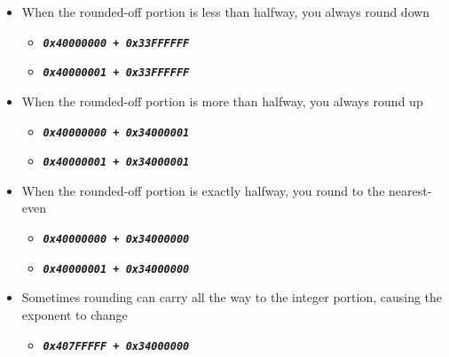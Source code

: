 \begin{itemize}
    \item When the rounded-off portion is less than halfway, you always round down
    \begin{itemize}
        \item[] \texttt{\textbf{\textit{0x40000000 + 0x33FFFFFF}}}
        \item[] \texttt{\textbf{\textit{0x40000001 + 0x33FFFFFF}}}
    \end{itemize}
    \item When the rounded-off portion is more than halfway, you always round up
    \begin{itemize}
        \item[] \texttt{\textbf{\textit{0x40000000 + 0x34000001}}}
        \item[] \texttt{\textbf{\textit{0x40000001 + 0x34000001}}}
    \end{itemize}
    \item When the rounded-off portion is exactly halfway, you round to the nearest-even
    \begin{itemize}
        \item[] \texttt{\textbf{\textit{0x40000000 + 0x34000000}}}
        \item[] \texttt{\textbf{\textit{0x40000001 + 0x34000000}}}
    \end{itemize}
    \item Sometimes rounding can carry all the way to the integer portion, causing the exponent to change
    \begin{itemize}
        \item[] \texttt{\textbf{\textit{0x407FFFFF + 0x34000000}}}
    \end{itemize}
\end{itemize}